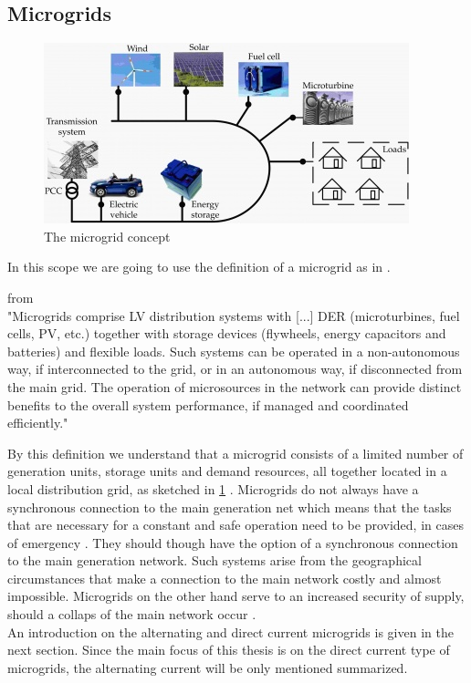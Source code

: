 \subsection{ Microgrids}
\label{subsec:microgr}
\begin{figure}[h]
\begin{center}
    \includegraphics[scale=0.8]{pictures/microgrid_concept.jpg}
    \caption{The microgrid concept}
    \label{figure_microgrid_concept}
\end{center}
\end{figure}
In this scope we are going to use the definition of a microgrid as in \cite{Hatzi}.
\begin{definition} from \cite{Hatzi} \\
"Microgrids comprise LV distribution systems with [...] DER (microturbines, fuel cells, PV, etc.) together with storage devices (flywheels, energy capacitors and
batteries) and flexible loads. Such systems can be operated in a non-autonomous way, if
interconnected to the grid, or in an autonomous way, if disconnected from the main grid. The
operation of microsources in the network can provide distinct benefits to the overall system
performance, if managed and coordinated efficiently."
\end{definition}
By this definition we understand that a microgrid consists of a limited number of generation units, storage units and demand resources, all together located in a local distribution grid, as sketched in \ref{figure_microgrid_concept} \cite{microgrid_concept}. Microgrids do not always have a synchronous connection to the main generation net which means that the tasks that are necessary for a constant and safe operation need to be provided, in cases of emergency \cite{concept}. They should though have the option of a synchronous connection to the main generation network. Such systems arise from the geographical circumstances that make a connection to the main network costly and almost impossible. Microgrids on the other hand serve to an increased security of supply, should a collaps of the main network occur \cite{concept}.\\ An introduction on the alternating and direct current microgrids is given in the next section. Since the main focus of this thesis is on the direct current type of microgrids, the alternating current will be only mentioned summarized.  
